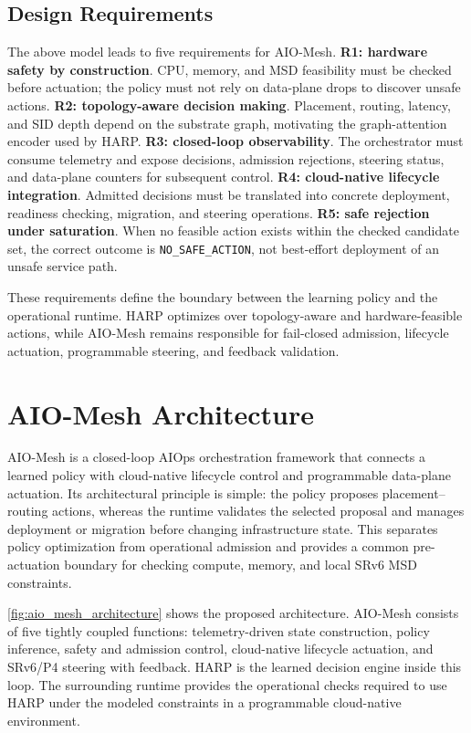 \documentclass[final,5p]{elsarticle}
\newcommand{\rev}[1]{\textcolor{BrickRed}{#1}}
\begin{document}
\subsection{Design Requirements}
\label{subsec:design_requirements}

The above model leads to five requirements for AIO-Mesh. \textbf{R1: hardware safety by construction}. CPU, memory, and MSD feasibility must be checked before actuation; the policy must not rely on data-plane drops to discover unsafe actions. \textbf{R2: topology-aware decision making}. Placement, routing, latency, and SID depth depend on the substrate graph, motivating the graph-attention encoder used by HARP. \textbf{R3: closed-loop observability}. The orchestrator must consume telemetry and expose decisions, admission rejections, steering status, and data-plane counters for subsequent control. \textbf{R4: cloud-native lifecycle integration}. Admitted decisions must be translated into concrete deployment, readiness checking, migration, and steering operations. \textbf{R5: safe rejection under saturation}. When no feasible action exists \rev{within the checked candidate set}, the correct outcome is \texttt{NO\_SAFE\_ACTION}, not best-effort deployment of an unsafe service path.

These requirements define the boundary between the learning policy and the operational runtime. HARP optimizes over topology-aware and hardware-feasible actions, while AIO-Mesh remains responsible for fail-closed admission, lifecycle actuation, programmable steering, and feedback validation.

\section{AIO-Mesh Architecture}
\label{sec:architecture}

AIO-Mesh is a closed-loop AIOps orchestration framework that connects a learned policy with cloud-native lifecycle control and programmable data-plane actuation. Its architectural principle is simple: \rev{the policy proposes placement--routing actions, whereas the runtime validates the selected proposal and manages deployment or migration before changing infrastructure state}. This separates policy optimization from operational admission and \rev{provides a common pre-actuation boundary for checking compute, memory, and local SRv6 MSD constraints}.

\autoref{fig:aio_mesh_architecture} shows the proposed architecture. AIO-Mesh consists of five tightly coupled functions: telemetry-driven state construction, policy inference, safety and admission control, cloud-native lifecycle actuation, and SRv6/P4 steering with feedback. HARP is the learned decision engine inside this loop. The surrounding runtime provides the operational \rev{checks} required to use HARP \rev{under the modeled constraints} in a programmable cloud-native environment.
\end{document}
